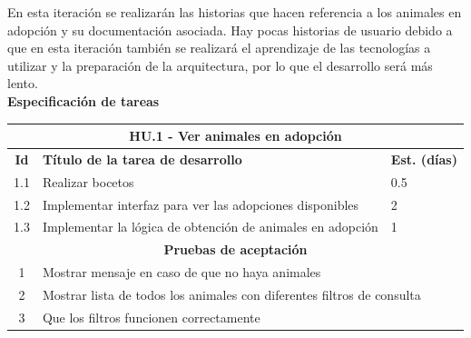 \large{En esta iteración se realizarán las historias que hacen referencia a los animales en adopción y su documentación asociada. Hay pocas historias de usuario debido a que en esta iteración también se realizará el aprendizaje de las tecnologías a utilizar y la preparación de la arquitectura, por lo que el desarrollo será más lento.}
 \\ 

\large{\textbf{Especificación de tareas}} \\


\begin{tabular}{|c|p{9.5cm}|p{1cm}|}
	\hline
	\multicolumn{3}{|c|}{\textbf{HU.1 - Ver animales en adopción}} \\
	\hline
	\textbf{Id} & \textbf{Título de la tarea de desarrollo} & \textbf{Est. (días)} \\
	\hline
	1.1 & Realizar bocetos & 0.5 \\ \hline
	1.2 &  Implementar interfaz para ver las adopciones disponibles & 2 \\ \hline
	1.3 &  Implementar la lógica de obtención de animales en adopción & 1 \\ \hline
	\multicolumn{3}{|c|}{\textbf{Pruebas de aceptación}} \\ \hline
	1 & \multicolumn{2}{|l|}{Mostrar mensaje en caso de que no haya animales} \\ \hline
	2 & \multicolumn{2}{|l|}{Mostrar lista de todos los animales con diferentes filtros de consulta} \\ \hline
	3 & \multicolumn{2}{|l|}{Que los filtros funcionen correctamente} \\ \hline
	
\end{tabular} \\ \\

\label{sec:hu1}

